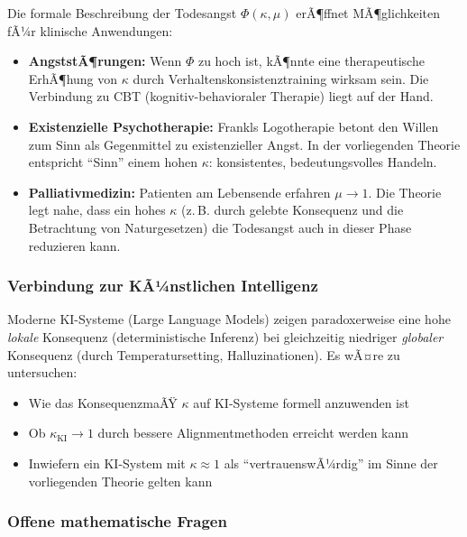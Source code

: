 ﻿\documentclass[a4paper,12pt]{article}
\theoremstyle{definition}
\begin{document}
Die formale Beschreibung der Todesangst $\Phi(\kappa, \mu)$ erÃ¶ffnet MÃ¶glichkeiten fÃ¼r klinische Anwendungen:
\begin{itemize}
\item \textbf{AngststÃ¶rungen:} Wenn $\Phi$ zu hoch ist, kÃ¶nnte eine therapeutische ErhÃ¶hung von $\kappa$ durch Verhaltenskonsistenztraining wirksam sein. Die Verbindung zu CBT (kognitiv-behavioraler Therapie) liegt auf der Hand.
\item \textbf{Existenzielle Psychotherapie:} Frankls Logotherapie \cite{frankl1946} betont den Willen zum Sinn als Gegenmittel zu existenzieller Angst. In der vorliegenden Theorie entspricht ``Sinn'' einem hohen $\kappa$: konsistentes, bedeutungsvolles Handeln.
\item \textbf{Palliativmedizin:} Patienten am Lebensende erfahren $\mu \to 1$. Die Theorie legt nahe, dass ein hohes $\kappa$ (z.\,B. durch gelebte Konsequenz und die Betrachtung von Naturgesetzen) die Todesangst auch in dieser Phase reduzieren kann.
\end{itemize}

\subsubsection{Verbindung zur KÃ¼nstlichen Intelligenz}

Moderne KI-Systeme (Large Language Models) zeigen paradoxerweise eine hohe \emph{lokale} Konsequenz (deterministische Inferenz) bei gleichzeitig niedriger \emph{globaler} Konsequenz (durch Temperatursetting, Halluzinationen). Es wÃ¤re zu untersuchen:
\begin{itemize}
\item Wie das KonsequenzmaÃŸ $\kappa$ auf KI-Systeme formell anzuwenden ist
\item Ob $\kappa_{\text{KI}} \to 1$ durch bessere Alignmentmethoden erreicht werden kann
\item Inwiefern ein KI-System mit $\kappa \approx 1$ als ``vertrauenswÃ¼rdig'' im Sinne der vorliegenden Theorie gelten kann
\end{itemize}

\subsubsection{Offene mathematische Fragen}
\end{document}
